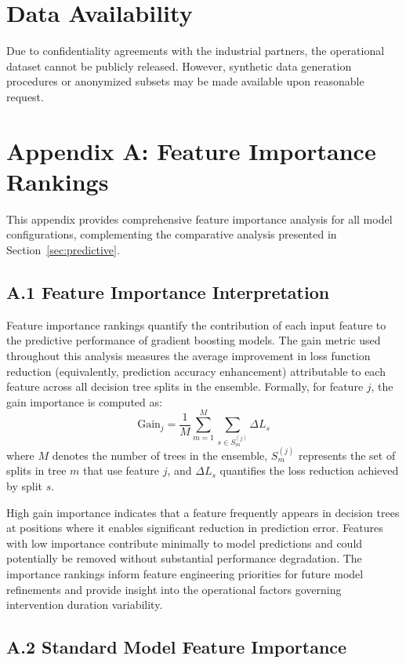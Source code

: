 \documentclass[preprint,12pt]{elsarticle}
\begin{document}
\section*{Data Availability}
Due to confidentiality agreements with the industrial partners, the operational dataset cannot be publicly released. However, synthetic data generation procedures or anonymized subsets may be made available upon reasonable request.
\section*{Appendix A: Feature Importance Rankings}

This appendix provides comprehensive feature importance analysis for all model configurations, complementing the comparative analysis presented in Section~\ref{sec:predictive}.

\subsection*{A.1 Feature Importance Interpretation}

Feature importance rankings quantify the contribution of each input feature to the predictive performance of gradient boosting models. The gain metric used throughout this analysis measures the average improvement in loss function reduction (equivalently, prediction accuracy enhancement) attributable to each feature across all decision tree splits in the ensemble. Formally, for feature $j$, the gain importance is computed as:
\begin{equation*}
\text{Gain}_j = \frac{1}{M} \sum_{m=1}^{M} \sum_{s \in S_m^{(j)}} \Delta L_s
\end{equation*}
where $M$ denotes the number of trees in the ensemble, $S_m^{(j)}$ represents the set of splits in tree $m$ that use feature $j$, and $\Delta L_s$ quantifies the loss reduction achieved by split $s$.

High gain importance indicates that a feature frequently appears in decision trees at positions where it enables significant reduction in prediction error. Features with low importance contribute minimally to model predictions and could potentially be removed without substantial performance degradation. The importance rankings inform feature engineering priorities for future model refinements and provide insight into the operational factors governing intervention duration variability.

\subsection*{A.2 Standard Model Feature Importance}
\end{document}
